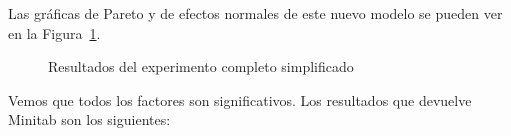 \documentclass[12pt,a4paper,twoside,openright,titlepage,final]{article}
\begin{document}
Las gráficas de Pareto y de efectos normales de este nuevo modelo se pueden ver en la Figura~\ref{fig:resultado_experimento_completo_2}.\\

\begin{figure}[htbp!]
	\centering
	\caption{Resultados del experimento completo simplificado} \label{fig:resultado_experimento_completo_2}
\end{figure}

Vemos que todos los factores son significativos. Los resultados que devuelve Minitab son los siguientes:
\end{document}
